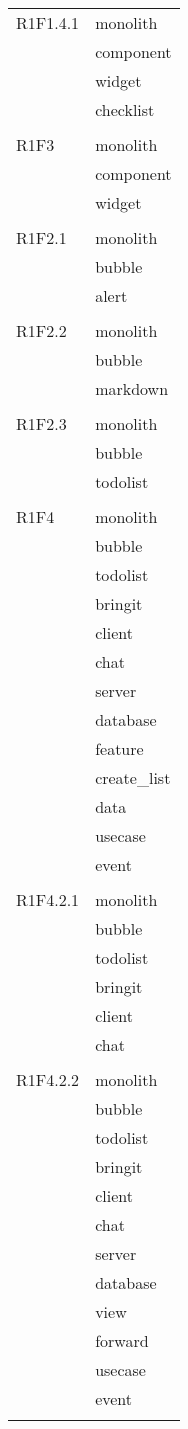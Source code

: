 \begin{center}
\begin{longtable}{|p{7cm}|p{7cm}|}
		R1F1.4.1 & monolith \\ & component \\ & widget \\ & checklist \\ & \\ \hline
		R1F3 & monolith \\ & component \\ & widget \\ & \\ \hline
		R1F2.1 & monolith \\ & bubble \\ & alert \\ & \\ \hline
		R1F2.2 & monolith \\ & bubble \\ & markdown \\ & \\ \hline
		R1F2.3 & monolith \\ & bubble \\ & todolist \\ & \\ \hline
		R1F4 & monolith \\ & bubble \\ & todolist \\ & bringit \\ & client \\ & chat \\ & server \\ & database \\ & feature \\ & create\_list \\ & data \\ & usecase \\ & event \\ & \\ \hline
		R1F4.2.1 & monolith \\ & bubble \\ & todolist \\ & bringit \\ & client \\ & chat \\ & \\ \hline
		R1F4.2.2 & monolith \\ & bubble \\ & todolist \\ & bringit \\ & client \\ & chat \\ & server \\ & database \\ & view \\ & forward \\ & usecase \\ & event \\ & \\ \hline

\end{longtable}
\end{center}
